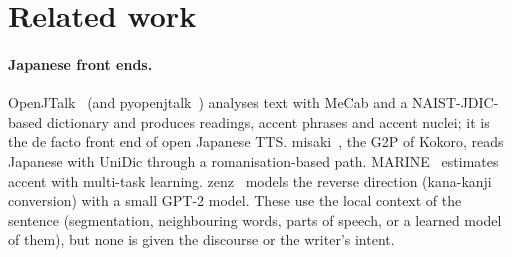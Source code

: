 \documentclass[11pt,a4paper]{article}
\begin{document}
\section{Related work}

\paragraph{Japanese front ends.} OpenJTalk~\citep{openjtalk} (and pyopenjtalk~\citep{pyopenjtalk}) analyses text with
MeCab and a NAIST-JDIC-based dictionary and produces readings, accent phrases and accent nuclei; it is the de facto
front end of open Japanese TTS. misaki~\citep{misaki}, the G2P of Kokoro, reads Japanese with UniDic through a
romanisation-based path. MARINE~\citep{park2022marine} estimates accent with multi-task learning. zenz~\citep{zenz}
models the reverse direction (kana-kanji conversion) with a small GPT-2 model. These use the local context of the
sentence (segmentation, neighbouring words, parts of speech, or a learned model of them), but none is given the
discourse or the writer's intent.
\end{document}
